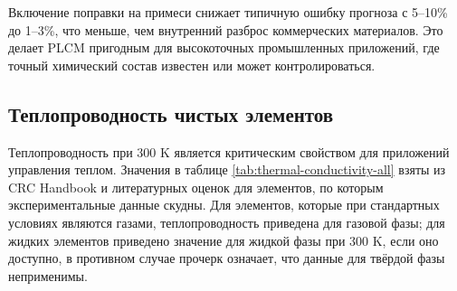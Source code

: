 \documentclass[12pt,a4paper]{article}
\begin{document}
	Включение поправки на примеси снижает типичную ошибку прогноза с 5–10\% до 1–3\%, что меньше, чем внутренний разброс коммерческих материалов. Это делает PLCM пригодным для высокоточных промышленных приложений, где точный химический состав известен или может контролироваться.
	
	\subsection{Теплопроводность чистых элементов}
	\label{subsec:thermal-conductivity-elements}
	
	Теплопроводность при 300 K является критическим свойством для приложений управления теплом. Значения в таблице \ref{tab:thermal-conductivity-all} взяты из CRC Handbook \cite{CRC} и литературных оценок для элементов, по которым экспериментальные данные скудны. Для элементов, которые при стандартных условиях являются газами, теплопроводность приведена для газовой фазы; для жидких элементов приведено значение для жидкой фазы при 300 K, если оно доступно, в противном случае прочерк означает, что данные для твёрдой фазы неприменимы.
	
\end{document}
